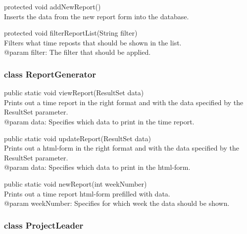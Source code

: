 \documentclass[a4paper]{article}
\begin{document}
\vspace{5mm}
\begin{hangparas}{1.5em}{1}
protected void addNewReport()\\
Inserts the data from the new report form into the database.
\end{hangparas}

\vspace{5mm}
\begin{hangparas}{1.5em}{1}
protected void filterReportList(String filter)\\
Filters what time reposts that should be shown in the list.\\
@param filter: The filter that should be applied.\\
\end{hangparas}


\subsubsection{class ReportGenerator}

\begin{hangparas}{1.5em}{1}
public static void viewReport(ResultSet data)\\
Prints out a time report in the right format and with the data specified by the ResultSet parameter.\\
@param data: Specifies which data to print in the time report. 
\end{hangparas}

\vspace{5mm}
\begin{hangparas}{1.5em}{1}
public static void updateReport(ResultSet data)\\
Prints out a html-form in the right format and with the data specified by the ResultSet parameter.\\ 
@param data: Specifies which data to print in the html-form.
\end{hangparas}

\vspace{5mm}
\begin{hangparas}{1.5em}{1}
public static void newReport(int weekNumber)\\
Prints out a time report html-form prefilled with data.\\
@param weekNumber: Specifies for which week the data should be shown.\\
\end{hangparas}
 

\subsubsection{class ProjectLeader}
\end{document}
